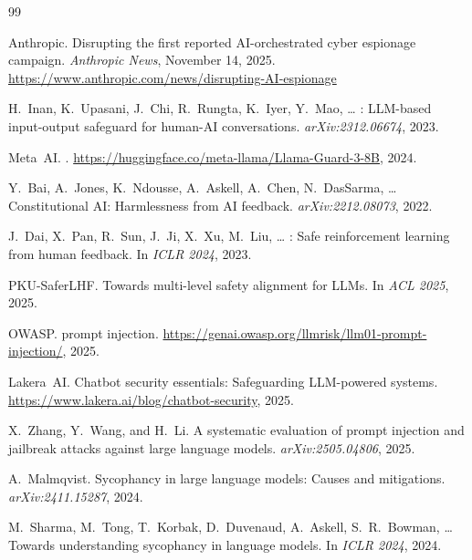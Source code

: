 \documentclass[conference]{IEEEtran}
\begin{document}
\begin{thebibliography}{99}

Anthropic.
\newblock Disrupting the first reported {AI}-orchestrated cyber espionage campaign.
\newblock \emph{Anthropic News}, November 14, 2025.
\newblock \url{https://www.anthropic.com/news/disrupting-AI-espionage}

H.~Inan, K.~Upasani, J.~Chi, R.~Rungta, K.~Iyer, Y.~Mao, \ldots{}
: {LLM}-based input-output safeguard for human-{AI}
  conversations.
\newblock \emph{arXiv:2312.06674}, 2023.

Meta~AI.
.
\newblock \url{https://huggingface.co/meta-llama/Llama-Guard-3-8B}, 2024.

Y.~Bai, A.~Jones, K.~Ndousse, A.~Askell, A.~Chen, N.~DasSarma, \ldots{}
\newblock Constitutional {AI}: Harmlessness from {AI} feedback.
\newblock \emph{arXiv:2212.08073}, 2022.

J.~Dai, X.~Pan, R.~Sun, J.~Ji, X.~Xu, M.~Liu, \ldots{}
: Safe reinforcement learning from human feedback.
\newblock In \emph{ICLR 2024}, 2023.

PKU-SaferLHF.
\newblock Towards multi-level safety alignment for {LLMs}.
\newblock In \emph{ACL 2025}, 2025.

OWASP.
 prompt injection.
\newblock \url{https://genai.owasp.org/llmrisk/llm01-prompt-injection/}, 2025.

Lakera~AI.
\newblock Chatbot security essentials: Safeguarding {LLM}-powered systems.
\newblock \url{https://www.lakera.ai/blog/chatbot-security}, 2025.

X.~Zhang, Y.~Wang, and H.~Li.
\newblock A systematic evaluation of prompt injection and jailbreak attacks against
  large language models.
\newblock \emph{arXiv:2505.04806}, 2025.

A.~Malmqvist.
\newblock Sycophancy in large language models: Causes and mitigations.
\newblock \emph{arXiv:2411.15287}, 2024.

M.~Sharma, M.~Tong, T.~Korbak, D.~Duvenaud, A.~Askell, S.~R.~Bowman, \ldots{}
\newblock Towards understanding sycophancy in language models.
\newblock In \emph{ICLR 2024}, 2024.


\end{thebibliography}
\end{document}
